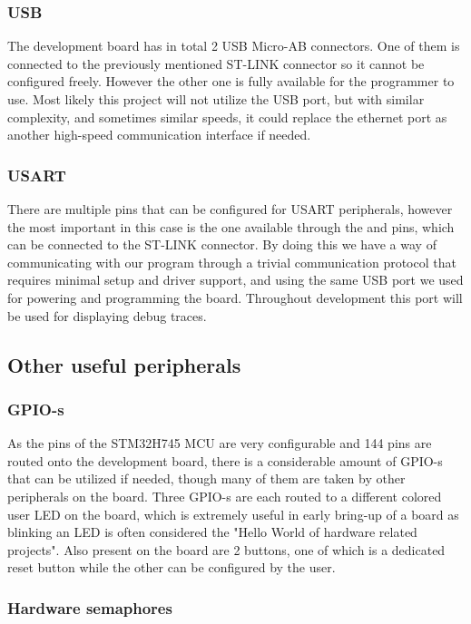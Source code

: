 \subsubsection{USB}

The development board has in total 2 USB Micro-AB connectors. One of them is connected to the previously mentioned ST-LINK connector so it cannot be configured freely. However the other one is fully available for the programmer to use. Most likely this project will not utilize the USB port, but with similar complexity, and sometimes similar speeds, it could replace the ethernet port as another high-speed communication interface if needed.

\subsubsection{USART}

There are multiple pins that can be configured for USART peripherals, however the most important in this case is the one available through the  and  pins, which can be connected to the ST-LINK connector. By doing this we have a way of communicating with our program through a trivial communication protocol that requires minimal setup and driver support, and using the same USB port we used for powering and programming the board. Throughout development this port will be used for displaying debug traces.

\subsection{Other useful peripherals}

\subsubsection{GPIO-s}

As the pins of the STM32H745 MCU are very configurable and 144 pins are routed onto the development board, there is a considerable amount of GPIO-s that can be utilized if needed, though many of them are taken by other peripherals on the board. Three GPIO-s are each routed to a different colored user LED on the board, which is extremely useful in early bring-up of a board as blinking an LED is often considered the "Hello World of hardware related projects". Also present on the board are 2 buttons, one of which is a dedicated reset button while the other can be configured by the user.

\subsubsection{Hardware semaphores}


